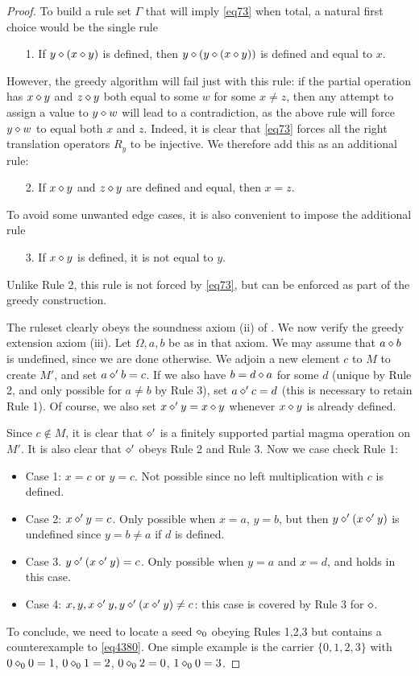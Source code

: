 \begin{proof} To build a rule set $\Gamma$ that will imply \eqref{eq73} when total, a natural first choice would be the single rule
\begin{itemize}
\item[1.] If $y \diamond (x \diamond y)$ is defined, then $y \diamond (y \diamond (x \diamond y))$ is defined and equal to $x$.
\end{itemize}
However, the greedy algorithm will fail just with this rule: if the partial operation has $x \diamond y$ and $z \diamond y$ both equal to some $w$ for some $x \neq z$, then any attempt to assign a value to $y \diamond w$ will lead to a contradiction, as the above rule will force $y \diamond w$ to equal both $x$ and $z$.  Indeed, it is clear that \eqref{eq73} forces all the right translation operators $R_y$ to be injective.  We therefore add this as an additional rule:
\begin{itemize}
\item[2.] If $x \diamond y$ and $z \diamond y$ are defined and equal, then $x=z$.
\end{itemize}
To avoid some unwanted edge cases, it is also convenient to impose the additional rule
\begin{itemize}
  \item[3.] If $x \diamond y$ is defined, it is not equal to $y$.
\end{itemize}
Unlike Rule 2, this rule is not forced by \eqref{eq73}, but can be enforced as part of the greedy construction.

The ruleset clearly obeys the soundness axiom (ii) of .  We now verify the greedy extension axiom (iii).  Let $\Omega,a,b$ be as in that axiom. We may assume that $a \diamond b$ is undefined, since we are done otherwise. We adjoin a new element $c$ to $M$ to create $M'$, and set $a \diamond' b = c$.  If we also have $b = d \diamond a$ for some $d$ (unique by Rule 2, and only possible for $a \neq b$ by Rule 3), set $a \diamond' c = d$ (this is necessary to retain Rule 1).  Of course, we also set $x \diamond' y = x \diamond y$ whenever $x \diamond y$ is already defined.

Since $c \not \in M$, it is clear that $\diamond'$ is a finitely supported partial magma operation on $M'$.  It is also clear that $\diamond'$ obeys Rule 2 and Rule 3.   Now we case check Rule 1:
\begin{itemize}
\item Case 1: $x=c$ or $y=c$.  Not possible since no left multiplication with $c$ is defined.
\item Case 2: $x \diamond' y = c$.  Only possible when $x = a$, $y = b$, but then $y \diamond' (x \diamond' y)$ is undefined since $y = b \neq a$ if $d$ is defined.
\item Case 3. $y \diamond' (x \diamond' y) = c$.  Only possible when $y=a$ and $x=d$, and holds in this case.
\item Case 4: $x, y, x \diamond' y, y \diamond' (x \diamond' y) \neq c$: this case is covered by Rule 3 for $\diamond$.
\end{itemize}
To conclude, we need to locate a seed $\diamond_0$ obeying Rules 1,2,3 but contains a counterexample to \eqref{eq4380}.  One simple example is the carrier $\{0,1,2,3\}$ with $0 \diamond_0 0 = 1$, $0 \diamond_0 1 = 2$, $0 \diamond_0 2 = 0$, $1 \diamond_0 0 = 3$.
\end{proof}

